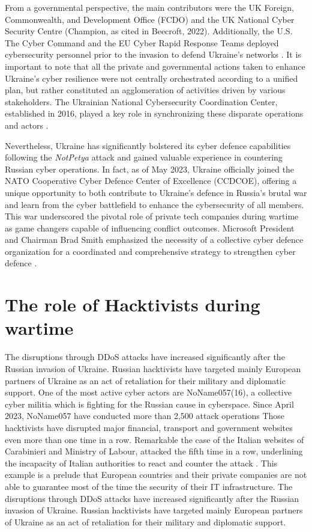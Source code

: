 From a governmental perspective, the main contributors were the UK Foreign, Commonwealth, and Development Office (FCDO) and the UK National Cyber Security Centre (Champion, as cited in Beecroft, 2022). Additionally, the U.S. The Cyber Command and the EU Cyber Rapid Response Teams deployed cybersecurity personnel prior to the invasion to defend Ukraine's networks \autocite[3]{beecroft_2022_evaluating}. It is important to note that all the private and governmental actions taken to enhance Ukraine's cyber resilience were not centrally orchestrated according to a unified plan, but rather constituted an agglomeration of activities driven by various stakeholders. The Ukrainian National Cybersecurity Coordination Center, established in 2016, played a key role in synchronizing these disparate operations and actors \autocite[3]{beecroft_2022_evaluating}.

Nevertheless, Ukraine has significantly bolstered its cyber defence capabilities following the \textit{NotPetya} attack and gained valuable experience in countering Russian cyber operations. In fact, as of May 2023, Ukraine officially joined the NATO Cooperative Cyber Defence Center of Excellence (CCDCOE), offering a unique opportunity to both contribute to Ukraine's defence in Russia's brutal war and learn from the cyber battlefield to enhance the cybersecurity of all members. This war underscored the pivotal role of private tech companies during wartime as game changers capable of influencing conflict outcomes. Microsoft President and Chairman Brad Smith emphasized the necessity of a collective cyber defence organization for a coordinated and comprehensive strategy to strengthen cyber defence \parencite{smith_2022_defending, beecroft_2022_evaluating}.

\section{The role of Hacktivists during wartime}

The disruptions through DDoS attacks have increased significantly after the Russian invasion of Ukraine. Russian hacktivists have targeted mainly European partners of Ukraine as an act of retaliation for their military and diplomatic support. One of the most active cyber actors are NoName057(16), a collective cyber militia which is fighting for the Russian cause in cyberspace. Since April 2023, NoName057 have conducted more than 2,500 attack operations  Those hacktivists have disrupted major financial, transport and government websites even more than one time in a row.  Remarkable the case of the Italian websites of Carabinieri and Ministry of Labour, attacked the fifth time in a row, underlining the incapacity of Italian authorities to react and counter the attack \autocite{redhotcyber_2023_colpito}. This example is a prelude that European countries and their private companies are not able to guarantee most of the time the security of their IT infrastructure. The disruptions through DDoS attacks have increased significantly after the Russian invasion of Ukraine. Russian hacktivists have targeted mainly European partners of Ukraine as an act of retaliation for their military and diplomatic support. 

